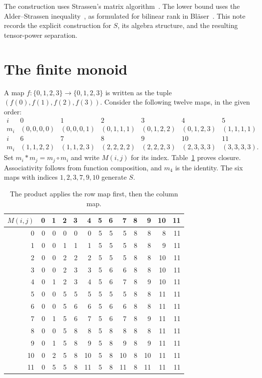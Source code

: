 \documentclass[11pt,a4paper]{article}
\begin{document}
The construction uses Strassen's matrix algorithm~\cite{strassen}.
The lower bound uses the Alder--Strassen inequality~\cite{alder}, as
formulated for bilinear rank in Bl\"aser~\cite{blaser}.
This note records the explicit construction for $S$, its algebra
structure, and the resulting tensor-power separation.

\section{The finite monoid}

A map $f:\{0,1,2,3\}\to\{0,1,2,3\}$ is written as the tuple
$(f(0),f(1),f(2),f(3))$. Consider the following twelve maps, in the given
order:
\begin{equation}\label{eq:maps}
\begin{array}{c|cccccc}
 i&0&1&2&3&4&5\\\hline
 m_i&(0,0,0,0)&(0,0,0,1)&(0,1,1,1)&(0,1,2,2)&(0,1,2,3)&(1,1,1,1)\\[3pt]
 i&6&7&8&9&10&11\\\hline
 m_i&(1,1,2,2)&(1,1,2,3)&(2,2,2,2)&(2,2,2,3)&(2,3,3,3)&(3,3,3,3).
\end{array}
\end{equation}
Set $m_i*m_j=m_j\circ m_i$ and write $M(i,j)$ for its index.
Table~\ref{tab:monoid} proves closure. Associativity follows from function
composition, and $m_4$ is the identity. The six maps with indices
$1,2,3,7,9,10$ generate $S$.

\begin{table}[ht]
\centering\small\setlength{\tabcolsep}{5.2pt}
\begin{tabular}{r|rrrrrrrrrrrr}
\toprule
$M(i,j)$&0&1&2&3&4&5&6&7&8&9&10&11\\\midrule
0 & 0 & 0 & 0 & 0 & 0 & 5 & 5 & 5 & 8 & 8 & 8 & 11 \\
1 & 0 & 0 & 1 & 1 & 1 & 5 & 5 & 5 & 8 & 8 & 9 & 11 \\
2 & 0 & 0 & 2 & 2 & 2 & 5 & 5 & 5 & 8 & 8 & 10 & 11 \\
3 & 0 & 0 & 2 & 3 & 3 & 5 & 6 & 6 & 8 & 8 & 10 & 11 \\
4 & 0 & 1 & 2 & 3 & 4 & 5 & 6 & 7 & 8 & 9 & 10 & 11 \\
5 & 0 & 0 & 5 & 5 & 5 & 5 & 5 & 5 & 8 & 8 & 11 & 11 \\
6 & 0 & 0 & 5 & 6 & 6 & 5 & 6 & 6 & 8 & 8 & 11 & 11 \\
7 & 0 & 1 & 5 & 6 & 7 & 5 & 6 & 7 & 8 & 9 & 11 & 11 \\
8 & 0 & 0 & 5 & 8 & 8 & 5 & 8 & 8 & 8 & 8 & 11 & 11 \\
9 & 0 & 1 & 5 & 8 & 9 & 5 & 8 & 9 & 8 & 9 & 11 & 11 \\
10 & 0 & 2 & 5 & 8 & 10 & 5 & 8 & 10 & 8 & 10 & 11 & 11 \\
11 & 0 & 5 & 5 & 8 & 11 & 5 & 8 & 11 & 8 & 11 & 11 & 11 \\
\bottomrule
\end{tabular}
\caption{The product applies the row map first, then the column map.}
\label{tab:monoid}
\end{table}
\end{document}
